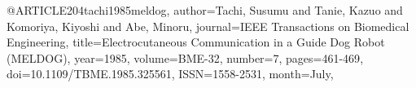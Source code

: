 @ARTICLE{204tachi1985meldog,
author={Tachi, Susumu and Tanie, Kazuo and Komoriya, Kiyoshi and Abe, Minoru},
journal={IEEE Transactions on Biomedical Engineering}, 
title={Electrocutaneous Communication in a Guide Dog Robot (MELDOG)}, 
year={1985},
volume={BME-32},
number={7},
pages={461-469},
doi={10.1109/TBME.1985.325561},
ISSN={1558-2531},
month={July},}